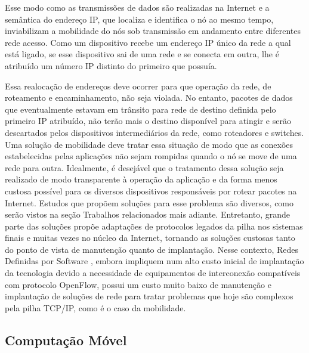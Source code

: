 \documentclass[	12pt, Times, openright, twoside, a4paper, english, brazil]{abntex2}
\begin{document}
Esse modo como as transmissões de dados são realizadas na Internet e a semântica do endereço IP, que localiza e identifica o nó ao mesmo tempo, inviabilizam a mobilidade do nós sob transmissão em andamento entre diferentes rede acesso. Como um dispositivo recebe um endereço IP único da rede a qual está ligado, se esse dispositivo sai de uma rede e se conecta em outra, lhe é atribuído um número IP distinto do primeiro que possuía. 

Essa realocação de endereços deve ocorrer para que operação da rede, de roteamento e encaminhamento, não seja violada. No entanto, pacotes de dados que eventualmente estavam em trânsito para rede de destino definida pelo primeiro IP atribuído, não terão mais o destino disponível para atingir e serão descartados pelos dispositivos intermediários da rede, como roteadores e switches. Uma solução de mobilidade deve tratar essa situação de modo que as conexões estabelecidas pelas aplicações não sejam rompidas quando o nó se move de uma rede para outra. Idealmente, é desejável que o tratamento dessa solução seja realizado de modo transparente à operação da aplicação e da forma menos custosa possível para os diversos dispositivos responsáveis por rotear pacotes na Internet. Estudos que propõem soluções para esse problema são diversos, como serão vistos na seção Trabalhos relacionados mais adiante. Entretanto, grande parte das soluções propõe adaptações de protocolos legados da pilha nos sistemas finais e muitas vezes no núcleo da Internet, tornando as soluções custosas tanto do ponto de vista de manutenção quanto de implantação. Nesse contexto, Redes Definidas por Software \cite{McKeown}, embora impliquem num alto custo inicial de implantação da tecnologia devido a necessidade de equipamentos de interconexão compatíveis com protocolo OpenFlow, possui um custo muito baixo de manutenção e implantação de soluções de rede para tratar problemas que hoje são complexos pela pilha TCP/IP, como é o caso da mobilidade.

\subsection{Computação Móvel}
\end{document}

